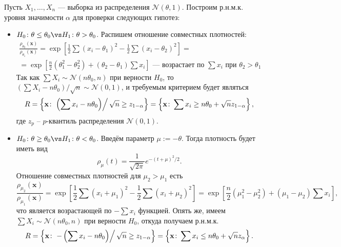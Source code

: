 \begin{example}
Пусть $X_1, \ldots, X_n$ --- выборка из распределения $\mathcal{N}(\theta, 1)$. Построим р.н.м.к. уровня значимости $\alpha$ для проверки следующих гипотез:
\begin{itemize}
    \item $H_0\colon \theta \le \theta_0 \vs H_1\colon \theta > \theta_0$. Распишем отношение совместных плотностей:
    \begin{gather*}
    \frac{\rho_{\theta_2}(\mathbf{x})}{\rho_{\theta_1}(\mathbf{x})} = \exp{\left[\frac{1}{2}\sum (x_i - \theta_1)^2-\frac{1}{2}\sum (x_i - \theta_2)^2\right]} =\\ =\exp{\left[\frac{n}{2}(\theta_1^2 - \theta_2^2) + (\theta_2-\theta_1)\sum x_i\right]}\text{ --- возрастает по $\sum x_i$ при } \theta_2 > \theta_1
\end{gather*}
Так как $\sum X_i \sim \mathcal{N}(n\theta_0, n)$ при верности $H_0$, то $\left(\sum X_i - n\theta_0\right)/\sqrt{n} \sim \mathcal{N}(0, 1)$, и требуемым критерием будет являться
$$R = \left\{\mathbf{x}\colon \left.\left(\sum x_i - n\theta_0\right)\right/\sqrt{n} \ge z_{1-\alpha}\right\} = \left\{\mathbf{x}\colon \sum x_i \ge n\theta_0 + \sqrt{n} z_{1-\alpha}\right\},$$
где $z_{p}$ -- $p$-квантиль распределения $\mathcal{N}(0, 1)$.

    \item $H_0 \colon \theta \ge \theta_0 \vs H_1\colon \theta < \theta_0$. Введём параметр $\mu := -\theta$. Тогда плотность будет иметь вид
    \[
    \rho_{\mu}(t) = \frac{1}{\sqrt{2\pi}}e^{-(t + \mu)^2/2}.
    \]
    Отношение совместных плотностей для $\mu_2 > \mu_1$ есть
    \[
    \frac{\rho_{\mu_2}(\mathbf{x})}{\rho_{\mu_1}(\mathbf{x})} = \exp{\left[\frac{1}{2}\sum (x_i + \mu_1)^2-\frac{1}{2}\sum (x_i + \mu_2)^2\right]} = \exp{\left[\frac{n}{2}(\mu_1^2 - \mu_2^2) + (\mu_1-\mu_2)\sum x_i\right]},
    \]
    что является возрастающей по $-\sum x_i$ функцией. Опять же, имеем $\sum X_i \sim \mathcal{N}(n\theta_0, n)$ при верности $H_0$, откуда получаем р.н.м.к.
    $$R = \left\{\mathbf{x}\colon \left.-\left(\sum x_i - n\theta_0\right) \right/ \sqrt{n} \ge z_{1 - \alpha}\right\} = \left\{\mathbf{x}\colon \sum x_i \le n\theta_0 + \sqrt{n}z_{\alpha}\right\}.$$
\end{itemize}
\end{example}


